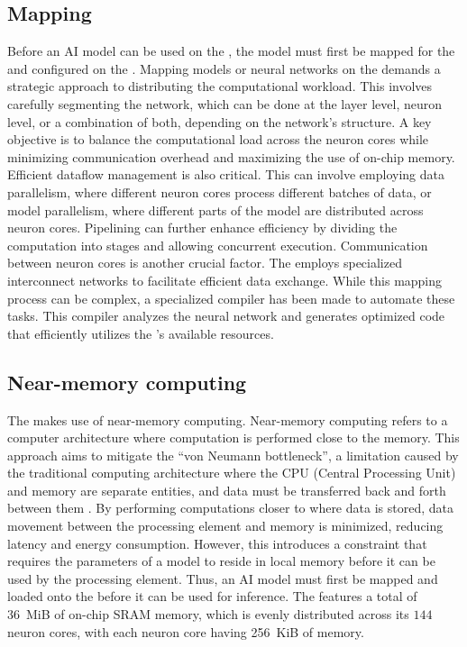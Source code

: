 \subsection{Mapping}
Before an AI model can be used on the \graicore{}, the model must first be mapped for the \graicore{} and configured on the \graicore{}.
Mapping models or neural networks on the \graicore{} demands a strategic approach to distributing the computational workload.
This involves carefully segmenting the network, which can be done at the layer level, neuron level, or a combination of both, depending on the network's structure. 
A key objective is to balance the computational load across the neuron cores while minimizing communication overhead and maximizing the use of on-chip memory.
Efficient dataflow management is also critical.
This can involve employing data parallelism, where different neuron cores process different batches of data, or model parallelism, where different parts of the model are distributed across neuron cores.
Pipelining can further enhance efficiency by dividing the computation into stages and allowing concurrent execution.
Communication between neuron cores is another crucial factor.
The \graicore{} employs specialized interconnect networks to facilitate efficient data exchange.
While this mapping process can be complex, a specialized compiler has been made to automate these tasks.
This compiler analyzes the neural network and generates optimized code that efficiently utilizes the \graicore{}'s available resources.

\subsection{Near-memory computing}
The \graicore{} makes use of near-memory computing.
Near-memory computing refers to a computer architecture where computation is performed close to the memory.
This approach aims to mitigate the ``von Neumann bottleneck'', a limitation caused by the traditional computing architecture where the CPU (Central Processing Unit) and memory are separate entities, and data must be transferred back and forth between them \cite{indiveriMemoryInformationProcessing2015}.
By performing computations closer to where data is stored, data movement between the processing element and memory is minimized, reducing latency and energy consumption.
However, this introduces a constraint that requires the parameters of a model to reside in local memory before it can be used by the processing element.
Thus, an AI model must first be mapped and loaded onto the \graicore{} before it can be used for inference.
The \graicore{} features a total of \SI{36}{MiB} of on-chip SRAM memory, which is evenly distributed across its $144$ neuron cores, with each neuron core having \SI{256}{KiB} of memory.

